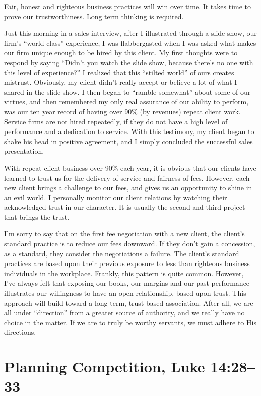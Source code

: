 \documentclass[12pt]{memoir}
\begin{document}
Fair, honest and righteous business practices will win over time.
It takes time to prove our trustworthiness. Long term thinking is
required.

Just this morning in a sales interview, after I illustrated through
a slide show, our firm's ``world class'' experience, I was flabbergasted
when I was asked what makes our firm unique enough to be hired by
this client. My first thoughts were to respond by saying ``Didn't
you watch the slide show, because there's no one with this level of
experience?'' I realized that this ``stilted world'' of ours creates
mistrust. Obviously, my client didn't really accept or believe a lot
of what I shared in the slide show. I then began to ``ramble somewhat''
about some of our virtues, and then remembered my only real assurance
of our ability to perform, was our ten year record of having over
90\% (by revenues) repeat client work. Service firms are not hired
repeatedly, if they do not have a high level of performance and a
dedication to service. With this testimony, my client began to shake
his head in positive agreement, and I simply concluded the successful
sales presentation. 

With repeat client business over 90\% each year, it is obvious that
our clients have learned to trust us for the delivery of service and
fairness of fees. However, each new client brings a challenge to our
fees, and gives us an opportunity to shine in an evil world. I personally
monitor our client relations by watching their acknowledged trust
in our character. It is usually the second and third project that
brings the trust. 

I'm sorry to say that on the first fee negotiation with a new client,
the client's standard practice is to reduce our fees downward. If
they don't gain a concession, as a standard, they consider the negotiations
a failure. The client's standard practices are based upon their previous
exposure to less than righteous business individuals in the workplace.
Frankly, this pattern is quite common. However, I've always felt that
exposing our books, our margins and our past performance illustrates
our willingness to have an open relationship, based upon trust. This
approach will build toward a long term, trust based association. After
all, we are all under ``direction'' from a greater source of authority,
and we really have no choice in the matter. If we are to truly be
worthy servants, we must adhere to His directions.

\section{Planning Competition, Luke 14:28--33}
\end{document}
